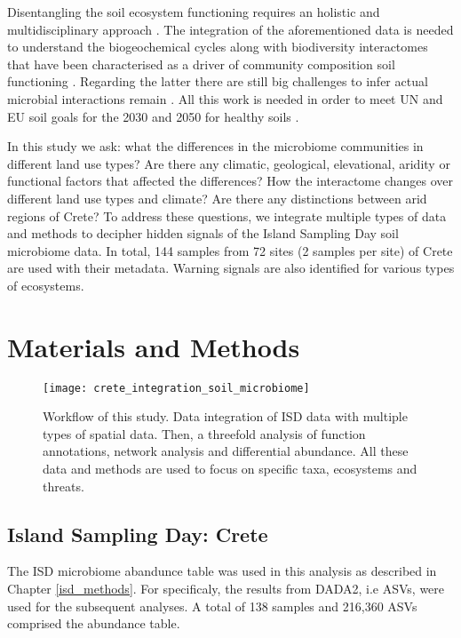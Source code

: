 Disentangling the soil ecosystem functioning requires an holistic and 
multidisciplinary approach \parencite{vogel2022}. The integration of the aforementioned
data is needed to understand the biogeochemical cycles along with biodiversity interactomes 
that have been characterised as a driver of community composition soil
functioning \parencite{GUSEVA2022108604}.
Regarding the latter there are still big challenges to infer actual microbial
interactions remain \parencite{Faust2021}. All this work is needed in order to meet
UN and EU soil goals for the 2030 and 2050 for healthy soils \parencite{LAL2021e00398}.

In this study we ask: what the differences in the microbiome communities in different land use types?
Are there any climatic, geological, elevational, aridity or functional factors that affected the differences?
How the interactome changes over different land use types and climate?
Are there any distinctions between arid regions of Crete?
To address these questions, we integrate multiple types of data and methods to decipher hidden 
signals of the Island Sampling Day soil microbiome data. In total, 144 samples from
72 sites (2 samples per site) of Crete are used with their metadata.
Warning signals are also identified for various types of ecosystems.


\section{Materials and Methods}\label{integration_methods}

\begin{figure}[t] 
    \centering\texttt{[image: crete\_integration\_soil\_microbiome]}
    \caption{Workflow of this study. Data integration of ISD data with multiple types of spatial data. Then, a threefold analysis of function annotations, network analysis and differential abundance. All these data and methods are used to focus on specific taxa, ecosystems and threats.}
    \label{fig:workflow}
\end{figure}

\subsection{Island Sampling Day: Crete}\label{isd_data}
The ISD microbiome abandunce table was used in this analysis as described in Chapter \ref{isd_methods}.
For specificaly, the results from DADA2, i.e ASVs, were used for the subsequent analyses. A total of 
138 samples and 216,360 ASVs comprised the abundance table.

